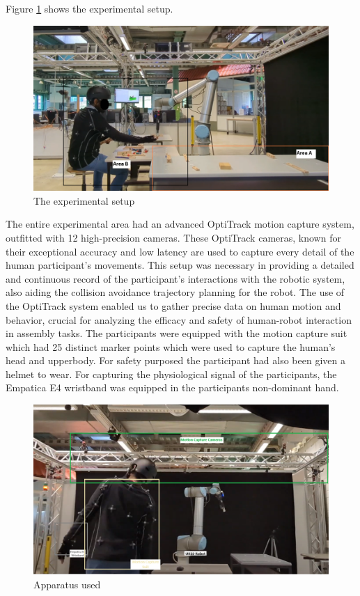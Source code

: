 Figure \ref{fig:setup} shows the experimental setup. 

 

\begin{figure}[h] 

    \centering 

    \includegraphics[width=0.9\columnwidth]{images/Setup.png} 

    \caption{The experimental setup} 

    \label{fig:setup} 

\end{figure} 



The entire experimental area had an advanced OptiTrack motion capture system, outfitted with 12 high-precision cameras. These OptiTrack cameras, known for their exceptional accuracy and low latency are used to capture every detail of the human participant's movements. This setup was necessary in providing a detailed and continuous record of the participant's interactions with the robotic system, also aiding the collision avoidance trajectory planning for the robot. The use of the OptiTrack system enabled us to gather precise data on human motion and behavior, crucial for analyzing the efficacy and safety of human-robot interaction in assembly tasks. The participants were equipped with the motion capture suit which had 25 distinct marker points which were used to capture the human's head and upperbody. For safety purposed the participant had also been given a helmet to wear.
For capturing the physiological signal of the participants, the Empatica E4 wristband was equipped in the participants non-dominant hand.


\begin{figure}[h]
	\centering
	\includegraphics[width=0.9\columnwidth]{images/apparatus.png}
	\caption{Apparatus used}
	\label{fig:apparatus}
\end{figure}


